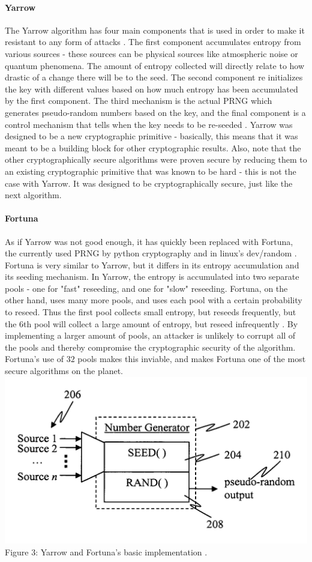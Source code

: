 \documentclass[11pt]{article}
\begin{document}
\paragraph{Yarrow}
The Yarrow algorithm has four main components that is used in order to make it resistant to any form of attacks \cite{Yarrow}. The first component accumulates entropy from various sources - these sources can be physical sources like atmospheric noise or quantum phenomena. The amount of entropy collected will directly relate to how drastic of a change there will be to the seed. The second component re initializes the key with different values based on how much entropy has been accumulated by the first component. The third mechanism is the actual PRNG which generates pseudo-random numbers based on the key, and the final component is a control mechanism that tells when the key needs to be re-seeded \cite{Yarrow}. Yarrow was designed to be a new cryptographic primitive - basically, this means that it was meant to be a building block for other cryptographic results. Also, note that the other cryptographically secure algorithms were proven secure by reducing them to an existing cryptographic primitive that was known to be hard - this is not the case with Yarrow. It was designed to be cryptographically secure, just like the next algorithm.
\paragraph{Fortuna}
As if Yarrow was not good enough, it has quickly been replaced with Fortuna, the currently used PRNG by python cryptography and in linux's dev/random \cite{Fortuna}. Fortuna is very similar to Yarrow, but it differs in its entropy accumulation and its seeding mechanism. In Yarrow, the entropy is accumulated into two separate pools - one for "fast" reseeding, and one for "slow" reseeding. Fortuna, on the other hand, uses many more pools, and uses each pool with a certain probability to reseed. Thus the first pool collects small entropy, but reseeds frequently, but the 6th pool will collect a large amount of entropy, but reseed infrequently \cite{Fortuna}. By implementing a larger amount of pools, an attacker is unlikely to corrupt all of the pools and thereby compromise the cryptographic security of the algorithm. Fortuna's use of $32$ pools makes this inviable, and makes Fortuna one of the most secure algorithms on the planet. 
\includegraphics[scale = .3]{fortuna} \newline
Figure 3: Yarrow and Fortuna's basic implementation \cite{patent}. 
\end{document}
